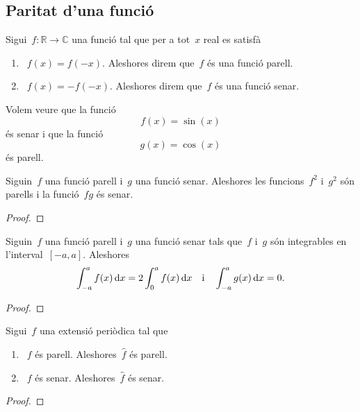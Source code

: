 \documentclass[../../Main.tex]{subfiles}
\begin{document}
	\subsection{Paritat d'una funció}
	\begin{definition}
		\label{def:funció parell}
		\label{def:funció senar}
		Sigui~\(f\colon\mathbb{R}\longrightarrow\mathbb{C}\) una funció tal que per a tot~\(x\) real es satisfà
		\begin{enumerate}
			\item~\(f(x)=f(-x)\).
			Aleshores direm que~\(f\) és una funció parell.
			\item~\(f(x)=-f(-x)\).
			Aleshores direm que~\(f\) és una funció senar.
		\end{enumerate}
	\end{definition}
	\begin{example}
		\label{ex:el sinus és una funció senar}
		\label{ex:el cosinus és una funció parell}
		Volem veure que la funció
		\[
		    f(x)=\sin(x)
		\]
		és senar i que la funció
		\[
		    g(x)=\cos(x)
		\]
		és parell.
		\begin{solution}
		\end{solution}
	\end{example}
	\begin{proposition}
		\label{prop:la paritat de funcions es comporta com el producte de signes}
		Siguin~\(f\) una funció parell i~\(g\) una funció senar.
		Aleshores les funcions~\(f^{2}\) i~\(g^{2}\) són parells i la funció~\(fg\) és senar.
		\begin{proof}
		\end{proof}
	\end{proposition}
	\begin{proposition}
		\label{prop:la integral d'una funció parell en un interval simètric és el doble que en mig interval}
		\label{prop:la integral d'una funció senar en un interval simètric és 0}
		Siguin~\(f\) una funció parell i~\(g\) una funció senar tals que~\(f\) i~\(g\) són integrables en l'interval~\([-a,a]\).
		Aleshores
		\[
		    \int_{-a}^{a}f(x)\mathop{}\!\mathrm{d} x=2\int_{0}^{a}f(x)\mathop{}\!\mathrm{d} x\quad\text{i}\quad\int_{-a}^{a}g(x)\mathop{}\!\mathrm{d} x=0.
		\]
		\begin{proof}
		\end{proof}
	\end{proposition}
	\begin{lemma}
		\label{lema:la paritat d'una funció es conserva en els coeficients de fourier}
		Sigui~\(f\) una extensió periòdica tal que
		\begin{enumerate}
			\item~\(f\) és parell.
			Aleshores~\(\widehat{f}\) és parell.
			\item~\(f\) és senar.
			Aleshores~\(\widehat{f}\) és senar.
		\end{enumerate}
		\begin{proof}
		\end{proof}
	\end{lemma}
\end{document}
